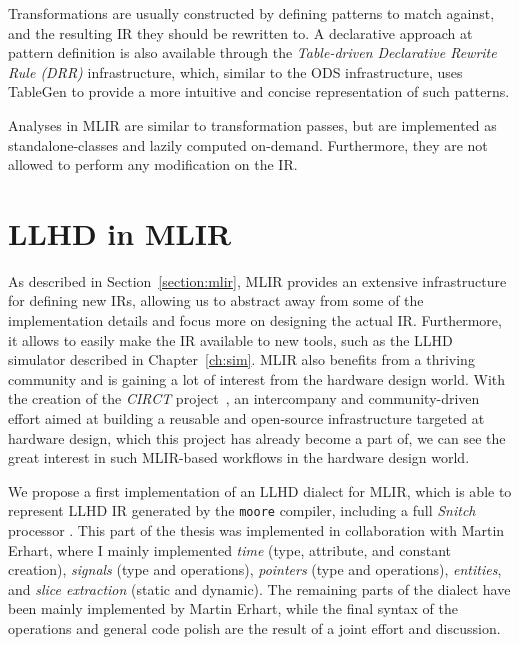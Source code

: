 Transformations are usually constructed by defining patterns to match against, and the resulting IR they should be rewritten to. A declarative approach at pattern definition is also available through the \textit{Table-driven Declarative Rewrite Rule (DRR)} infrastructure, which, similar to the ODS infrastructure, uses TableGen to provide a more intuitive and concise representation of such patterns.

Analyses in MLIR are similar to transformation passes, but are implemented as standalone-classes and lazily computed on-demand. Furthermore, they are not allowed to perform any modification on the IR.


\section{LLHD in MLIR}
\label{section:llhdmlir}
As described in Section~\ref{section:mlir}, MLIR provides an extensive infrastructure for defining new IRs, allowing us to abstract away from some of the implementation details and focus more on designing the actual IR. Furthermore, it allows to easily make the IR available to new tools, such as the LLHD simulator described in Chapter~\ref{ch:sim}. MLIR also benefits from a thriving community and is gaining a lot of interest from the hardware design world. With the creation of the \textit{CIRCT} project~\cite{circt}, an intercompany and community-driven effort aimed at building a reusable and open-source infrastructure targeted at hardware design, which this project has already become a part of, we can see the great interest in such MLIR-based workflows in the hardware design world.

We propose a first implementation of an LLHD dialect for MLIR, which is able to represent LLHD IR generated by the \texttt{moore} compiler, including a full \textit{Snitch} processor \cite{Zaruba2020}. This part of the thesis was implemented in collaboration with Martin Erhart, where I mainly implemented \textit{time} (type, attribute, and constant creation), \textit{signals} (type and operations), \textit{pointers} (type and operations), \textit{entities}, and \textit{slice extraction} (static and dynamic). The remaining parts of the dialect have been mainly implemented by Martin Erhart, while the final syntax of the operations and general code polish are the result of a joint effort and discussion.

